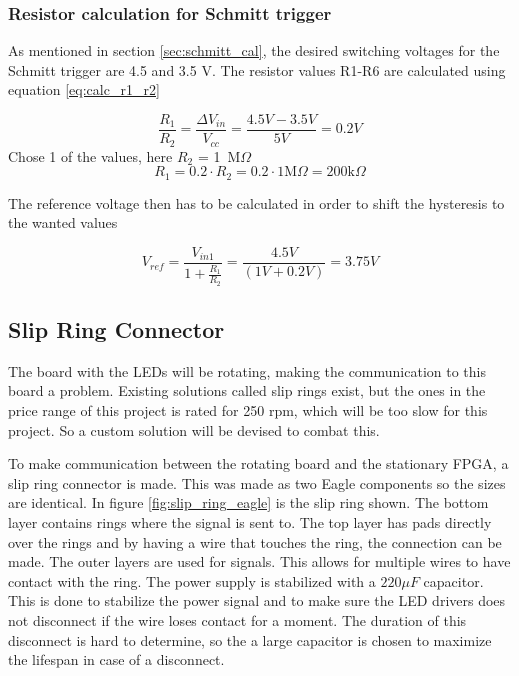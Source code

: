 \subsubsection*{Resistor calculation for Schmitt trigger}
As mentioned in section \ref{sec:schmitt_cal}, the desired switching voltages for the Schmitt trigger are 4.5 and 3.5 V.
The resistor values R1-R6 are calculated using equation \ref{eq:calc_r1_r2}\cite{book:prac_ele}

\begin{equation}\label{eq:calc_r1_r2}
 \frac{R_1}{R_2} = \frac{\Delta V_{in}}{V_{cc}} = \frac{4.5V-3.5V}{5V} = 0.2V
\end{equation}
Chose 1 of the values, here $R_2$ = 1\ M$\Omega$
\begin{equation}
 R_1 = 0.2\cdot R_2 = 0.2\cdot 1 \text{M} \Omega = 200 \text{k}\Omega
\end{equation}

The reference voltage then has to be calculated in order to shift the hysteresis to the wanted values

\begin{equation}
 V_{ref} = \frac{V_{in1}}{1+\frac{R_1}{R_2}} = \frac{4.5V}{(1V+0.2V)} = 3.75 V
\end{equation}

\subsection{Slip Ring Connector}\label{sec:ring_connector}
The board with the LEDs will be rotating, making the communication to this board a problem.
Existing solutions called slip rings exist, but the ones in the price range of this project is rated for 250 rpm, which will be too slow for this project.
So a custom solution will be devised to combat this.

To make communication between the rotating board and the stationary FPGA, a slip ring connector is made.
This was made as two Eagle components so the sizes are identical.
In figure \ref{fig:slip_ring_eagle} is the slip ring shown.
The bottom layer contains rings where the signal is sent to.
The top layer has pads directly over the rings and by having a wire that touches the ring, the connection can be made.
The outer layers are used for signals.
This allows for multiple wires to have contact with the ring.
The power supply is stabilized with a $220 \mu F$ capacitor.
This is done to stabilize the power signal and to make sure the LED drivers does not disconnect if the wire loses contact for a moment.
The duration of this disconnect is hard to determine, so the a large capacitor is chosen to maximize the lifespan in case of a disconnect.

